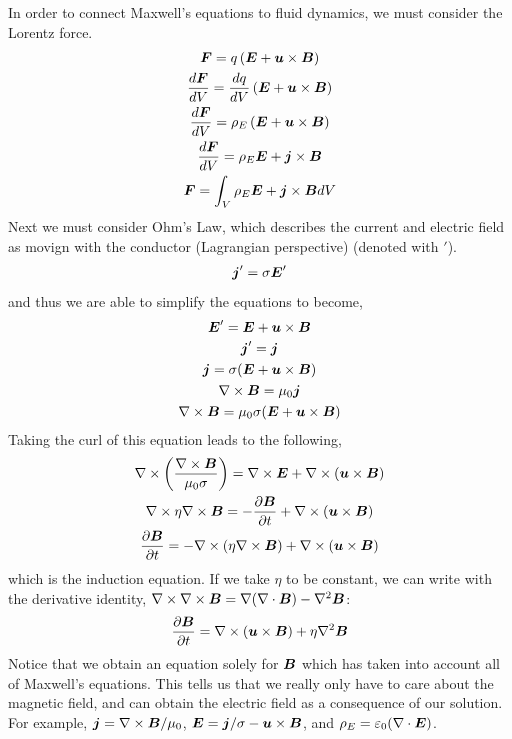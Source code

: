 \documentclass{article}
\begin{document}
In order to connect Maxwell's equations to fluid dynamics, we must consider the
Lorentz force. 
\begin{gather*}
    \boldsymbol{F} = q\left(\boldsymbol{E} + \boldsymbol{u}\times\boldsymbol{B}\right)\\
    \frac{d\boldsymbol{F}}{d V} = \frac{dq}{dV}\left(\boldsymbol{E} + \boldsymbol{u}\times\boldsymbol{B}\right)\\
    \frac{d\boldsymbol{F}}{d V} = \rho_E\left(\boldsymbol{E} + \boldsymbol{u}\times\boldsymbol{B}\right)\\
    \frac{d\boldsymbol{F}}{d V} = \rho_E\boldsymbol{E} + \boldsymbol{j}\times\boldsymbol{B}\\
    \boldsymbol{F} = \int_V \rho_E\boldsymbol{E} + \boldsymbol{j}\times\boldsymbol{B} dV
\end{gather*}
Next we must consider Ohm's Law, which describes the current and electric field
as movign with the conductor (Lagrangian perspective) (denoted with $'$). 
\begin{gather*}
    \boldsymbol{j}' = \sigma\boldsymbol{E}'
\end{gather*}
and thus we are able to simplify the equations to become, 
\begin{gather*}
    \boldsymbol{E}' = \boldsymbol{E} + \boldsymbol{u}\times\boldsymbol{B}\\
    \boldsymbol{j}' = \boldsymbol{j}\\
    \boldsymbol{j} = \sigma(\boldsymbol{E} + \boldsymbol{u}\times\boldsymbol{B})\\
    \nabla\times\boldsymbol{B} = \mu_0\boldsymbol{j}\\
    \nabla\times\boldsymbol{B} = \mu_0\sigma(\boldsymbol{E} + \boldsymbol{u}\times\boldsymbol{B})
\end{gather*}
Taking the curl of this equation leads to the following,
\begin{gather*}
    \nabla\times\left(\frac{\nabla\times\boldsymbol{B}}{\mu_0\sigma}\right) = \nabla\times\boldsymbol{E} +
    \nabla\times\left(\boldsymbol{u}\times\boldsymbol{B}\right)\\
    \nabla\times\eta\nabla\times\boldsymbol{B} = -\frac{\partial \boldsymbol{B}}{\partial t} + \nabla\times(\boldsymbol{u}\times\boldsymbol{B})\\
    \frac{\partial \boldsymbol{B}}{\partial t} = -\nabla\times(\eta\nabla\times\boldsymbol{B}) + \nabla\times(\boldsymbol{u}\times\boldsymbol{B})
\end{gather*}
which is the induction equation. If we take $\eta$ to be constant, we can write
with the derivative identity, $\nabla\times\nabla\times\boldsymbol{B} = \nabla(\nabla \cdot{\boldsymbol{B}}) -
\nabla^2\boldsymbol{B}$:
\begin{gather*}
    \frac{\partial \boldsymbol{B}}{\partial t} = \nabla\times(\boldsymbol{u}\times\boldsymbol{B}) + \eta\nabla^2\boldsymbol{B}
\end{gather*}
Notice that we obtain an equation solely for $\boldsymbol{B}$ which has taken into account
all of Maxwell's equations. This tells us that we really only have to care about
the magnetic field, and can obtain the electric field as a consequence of our
solution. For example, $\boldsymbol{j} = \nabla\times\boldsymbol{B}/\mu_0$, $\boldsymbol{E}=\boldsymbol{j}/\sigma -
\boldsymbol{u}\times\boldsymbol{B}$, and $\rho_E = \varepsilon_0(\nabla \cdot{\boldsymbol{E}})$. 
\end{document}
